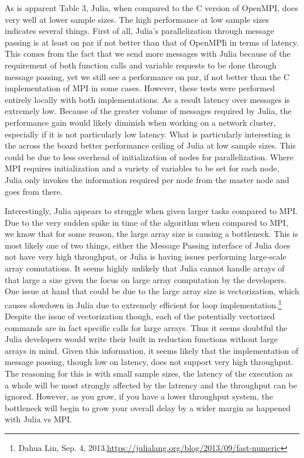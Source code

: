 \documentclass[10pt]{article}
\begin{document}
	As is apparent Table 3, Julia, when compared to the C version of OpenMPI, does very well at lower sample sizes. The high performance at low sample sizes indicates several things. First of all, Julia's parallelization through message passing is at least on par if not better than that of OpenMPIi in terms of latency. This comes from the fact that we send more messages with Julia because of the requirement of both function calls and variable requests to be done through message passing, yet we still see a performance on par, if not better than the C implementation of MPI in some cases. However, these tests were performed entirely locally with both implementations. As a result latency over messages is extremely low. Because of the greater volume of messages required by Julia, the performance gain would likely diminish when working on a network cluster, especially if it is not particularly low latency. What is particularly interesting is the across the board better performance ceiling of Julia at low sample sizes. This could be due to less overhead of initialization of nodes for parallelization. Where MPI requires initialization and a variety of variables to be set for each node, Julia only invokes the information required per node from the master node and goes from there.

	Interestingly, Julia appears to struggle when given larger tasks compared to MPI. Due to the very sudden spike in time of the algorithm when compared to MPI, we know that for some reason, the large array size is causing a bottleneck. This is most likely one of two things, either the Message Passing interface of Julia does not have very high throughput, or Julia is having issues performing large-scale array comutations. It seems highly unlikely that Julia cannot handle arrays of that large a size given the focus on large array computation by the developers. One issue at hand that could be due to the large array size is vectorization, which causes slowdown in Julia due to extremely efficient for loop implementation.\footnote{Dahua Lin, Sep. 4, 2013,\url{https://julialang.org/blog/2013/09/fast-numeric}} Despite the issue of vectorization though, each of the potentially vectorized commands are in fact specific calls for large arrays. Thus it seems doubtful the Julia developers would write their built in reduction functions without large arrays in mind. Given this information, it seems likely that the implementation of message passing, though low on latency, does not support very high throughput. The reasoning for this is with small sample sizes, the latency of the execution as a whole will be most strongly affected by the latrency and the throughput can be ignored. However, as you grow, if you have a lower throughput system, the bottleneck will begin to grow your overall delay by a wider margin as happened with Julia vs MPI. 


\printbibliography

\listoftodos
\end{document}
